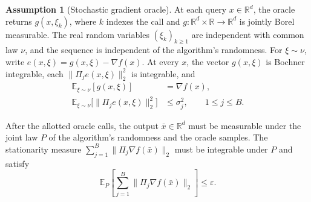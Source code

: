\documentclass[10pt]{article}
\theoremstyle{definition}
\newtheorem{assumption}{Assumption}
\begin{document}
\begin{assumption}[Stochastic gradient oracle]
At each query $x\in\mathbb{R}^d$, the oracle returns $g(x,\xi_k)$, where $k$ indexes the call and $g:\mathbb{R}^d\times\mathbb{R}\to\mathbb{R}^d$ is jointly Borel measurable. The real random variables $(\xi_k)_{k\geq 1}$ are independent with common law $\nu$, and the sequence is independent of the algorithm's randomness. For $\xi\sim\nu$, write $e(x,\xi)=g(x,\xi)-\nabla f(x)$. At every $x$, the vector $g(x,\xi)$ is Bochner integrable, each $\|\Pi_j e(x,\xi)\|_2^2$ is integrable, and
\[
\begin{aligned}
\mathbb{E}_{\xi\sim\nu}[g(x,\xi)] &= \nabla f(x),\\
\mathbb{E}_{\xi\sim\nu}\bigl[\|\Pi_j e(x,\xi)\|_2^2\bigr] &\leq \sigma_j^2,
\qquad 1\leq j\leq B.
\end{aligned}
\]
\end{assumption}

After the allotted oracle calls, the output $\bar{x}\in\mathbb{R}^d$ must be measurable under the joint law $P$ of the algorithm's randomness and the oracle samples. The stationarity measure $\sum_{j=1}^B\|\Pi_j\nabla f(\bar{x})\|_2$ must be integrable under $P$ and satisfy
\[
\mathbb{E}_P\left[\sum_{j=1}^B\|\Pi_j\nabla f(\bar{x})\|_2\right]\leq\varepsilon.
\]
\end{document}
